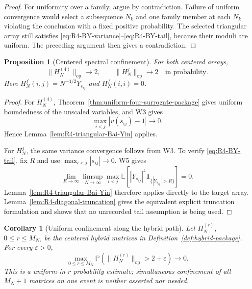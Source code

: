 \documentclass[10pt,a4paper]{amsart}
\newtheorem{proposition}[theorem]{Proposition}
\newtheorem{corollary}[theorem]{Corollary}
\newcommand{\E}{\mathbb E}
\newcommand{\op}{\mathrm{op}}
\newcommand{\one}{\mathbf 1}
\newcommand{\norm}[1]{\lVert #1\rVert}
\begin{document}
\begin{proof}
For uniformity over a family, argue by contradiction.  Failure of uniform
convergence would select a subsequence \(N_k\) and one family member at each
\(N_k\) violating the conclusion with a fixed positive probability.  The
selected triangular array still satisfies
\eqref{eq:R4-BY-variance}--\eqref{eq:R4-BY-tail}, because their moduli are
uniform.  The preceding argument then gives a contradiction.
\end{proof}

\begin{proposition}[Centered spectral confinement]
\label{prop:R4-centered-confinement}
For both centered arrays,
\begin{equation}\label{eq:R4-norm-convergence}
 \norm{H_N^{(4)}}_{\op}\longrightarrow2,
 \qquad
 \norm{H_N^f}_{\op}\longrightarrow2
 \quad\text{in probability}.
\end{equation}
Here \(H_N^f(i,j)=N^{-1/2}Y_{s_{ij}}\) and \(H_N^f(i,i)=0\).
\end{proposition}

\begin{proof}
For \(H_N^{(4)}\), Theorem~\ref{thm:uniform-four-surrogate-package} gives
uniform boundedness of the unscaled variables, and W3 gives
\[
 \max_{i<j}|v(s_{ij})-1|\longrightarrow0.
\]
Hence Lemma~\ref{lem:R4-triangular-Bai-Yin} applies.

For \(H_N^f\), the same variance convergence follows from W3.  To verify
\eqref{eq:R4-BY-tail}, fix \(R\) and use
\(\max_{i<j}|s_{ij}|\to0\).  W5 gives
\[
 \lim_{R\to\infty}\limsup_{N\to\infty}
 \max_{i<j}
 \E\!\left[|Y_{s_{ij}}|^4
 \one_{\{|Y_{s_{ij}}|>R\}}\right]=0.
\]
Lemma~\ref{lem:R4-triangular-Bai-Yin} therefore applies directly to the
target array.  Lemma~\ref{lem:R4-diagonal-truncation} gives the equivalent
explicit truncation formulation and shows that no unrecorded tail assumption
is being used.
\end{proof}

\begin{corollary}[Uniform confinement along the hybrid path]
\label{cor:R4-hybrid-confinement}
Let \(H_N^{(r)}\), \(0\le r\le M_N\), be the centered hybrid matrices in
Definition~\ref{def:hybrid-package}.  For every \(\varepsilon>0\),
\begin{equation}\label{eq:R4-uniform-hybrid-confinement}
 \max_{0\le r\le M_N}
 \mathbb P\!\left(\norm{H_N^{(r)}}_{\op}>2+\varepsilon\right)
 \longrightarrow0.
\end{equation}
This is a uniform-in-\(r\) probability estimate; simultaneous confinement of
all \(M_N+1\) matrices on one event is neither asserted nor needed.
\end{corollary}
\end{document}
